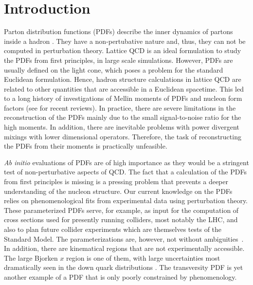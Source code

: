 \section{Introduction}
\label{sec:intro}

Parton distribution functions (PDFs) describe the inner dynamics of partons inside a hadron \cite{Feynman:102074}.
They have a non-pertubative nature and, thus, they can not be computed in perturbation theory. Lattice QCD is an
ideal formulation to study the PDFs from first principles, in large scale simulations.
However, PDFs are usually defined on the light cone, which poses a problem for the standard Euclidean formulation.
Hence,  hadron structure calculations in lattice QCD are related to other quantities  that are accessible in a Euclidean
spacetime. This led to a long history of investigations of Mellin moments of PDFs and nucleon form factors (see
\cite{Constantinou:2014tga, Constantinou:2015agp,Alexandrou:2015yqa, Alexandrou:2015xts, Syritsyn:2014saa}
for recent reviews). In practice, there are severe limitations in the reconstruction of the PDFs mainly due to the small signal-to-noise ratio for the
high moments. In addition,  there are inevitable problems with power divergent mixings with lower dimensional operators.
Therefore, the task of reconstructing the PDFs from their moments is practically unfeasible.

\medskip
{\textit{Ab initio}} evaluations of PDFs are of high importance as they would be a stringent test of non-perturbative
aspects of QCD. The fact that a calculation of the PDFs from first principles is missing is a pressing problem that
prevents a deeper understanding of the nucleon structure.
Our current knowledge on the PDFs relies on phenomenological fits from experimental data using perturbation theory.
These parameterized PDFs serve, for example, as input for the computation of cross sections used for
presently running colliders, most notably the LHC, and also to plan future collider experiments which are themselves
tests of the Standard Model. The parameterizations are, however, not without ambiguities~\cite{Jimenez-Delgado:2013sma}.
In addition, there are kinematical regions that are not experimentally accessible.
The large Bjorken $x$ region is one of them, with large uncertainties most dramatically seen in the down quark
distributions \cite{Accardi:2016qay,Alekhin:2017kpj}. The transversity PDF is yet another example of a PDF that is
only poorly constrained by phenomenology.

